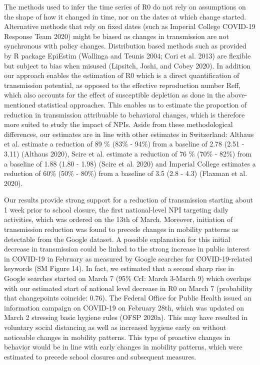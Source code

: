 The methods used to infer the time series of R0 do not rely on assumptions on the shape of how it changed in time, nor on the dates at which change started. Alternative methods that rely on fixed dates (such as Imperial College COVID-19 Response Team 2020) might be biased as changes in transmission are not synchronous with policy changes. Distribution based methods such as provided by R package EpiEstim (Wallinga and Teunis 2004; Cori et al. 2013) are flexible but subject to bias when misused (Lipsitch, Joshi, and Cobey 2020). In addition our approach enables the estimation of R0 which is a direct quantification of transmission potential, as opposed to the effective reproduction number Reff, which also accounts for the effect of susceptible depletion as done in the above-mentioned statistical approaches. This enables us to estimate the proportion of reduction in transmission attribuable to behavioral changes, which is therefore more suited to study the impact of NPIs. Aside from these methodological differences, our estimates are in line with other estimates in Switzerland:  Althaus et al. estimate a reduction of 89 \%  (83\% - 94\%) from a baseline of 2.78 (2.51 - 3.11) (Althaus 2020), Scire et al. estimate a reduction of 76 \% (70\% - 82\%) from a baseline of 1.88 (1.80 - 1.98) (Scire et al. 2020) and Imperial College estimates a reduction of 60\% (50\% - 80\%) from a baseline of 3.5 (2.8 - 4.3) (Flaxman et al. 2020). 

Our results provide strong support for a reduction of transmission starting about 1 week prior to school closure, the first national-level NPI targeting daily activities, which was ordered on the 13th of March. Moreover, initiation of transmission reduction was found to precede changes in mobility patterns as detectable from the Google dataset. A possible explanation for this initial decrease in transmission could be linked to the strong increase in public interest in COVID-19 in February as measured by Google searches for COVID-19-related keywords (SM Figure 14). In fact, we estimated that a second sharp rise in Google searches started on March 7 (95\% CrI: March 3-March 9) which overlaps with our estimated start of national level decrease in R0 on March 7 (probability that changepoints coincide: 0.76). The Federal Office for Public Health issued an information campaign on COVID-19 on February 28th, which was updated on March 2 stressing basic hygiene rules (OFSP 2020a). This may have resulted in voluntary social distancing as well as increased hygiene early on without noticeable changes in mobility patterns. This type of proactive changes in behavior would be in line with early changes in mobility patterns, which were estimated to precede school closures and subsequent measures.

